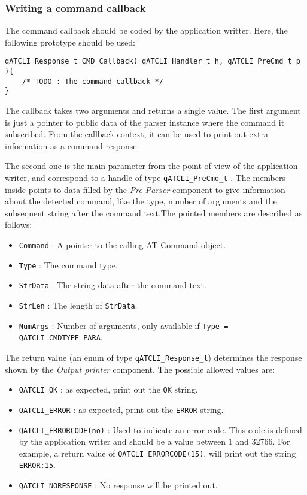 \subsubsection{Writing a command callback}
The command callback should be coded by the application writter. Here, the following prototype should be used:
\medskip

\begin{lstlisting}[style=CStyle]
qATCLI_Response_t CMD_Callback( qATCLI_Handler_t h, qATCLI_PreCmd_t p ){
    /* TODO : The command callback */
}
\end{lstlisting}

The callback takes two arguments and returns a single value. The first argument is just a pointer to public data of the parser instance where the command it subscribed. From the callback context, it can be used to print out extra information as a command response.
\medskip

The second one is the main parameter from the point of view of the application writer, and correspond to a handle of type \lstinline{qATCLI_PreCmd_t} . The members inside points to data filled by the \textit{Pre-Parser} component to give information about the detected command, like the type, number of arguments and the subsequent string after the command text.The pointed members are described as follows:

\begin{itemize}
    \item \lstinline{Command} : A pointer to the calling AT Command object.
    \item \lstinline{Type} : The command type.
    \item \lstinline{StrData} : The string data after the command text.
    \item \lstinline{StrLen} : The length of \lstinline{StrData}.
    \item \lstinline{NumArgs} : Number of arguments, only available if \lstinline{Type = QATCLI_CMDTYPE_PARA}.
\end{itemize}

The return value (an enum of type \lstinline{qATCLI_Response_t})  determines the response shown by the \textit{Output printer} component. The possible allowed values are:

\begin{itemize}
    \item \lstinline{QATCLI_OK} : as expected, print out the \lstinline{OK} string.
    \item \lstinline{QATCLI_ERROR} : as expected, print out the \lstinline{ERROR} string.
    \item \lstinline{QATCLI_ERRORCODE(no)} : Used to indicate an error code. This code is defined by the application writer and should be a value between 1 and 32766. For example, a return value of \lstinline{QATCLI_ERRORCODE(15)}, will print out the string \lstinline{ERROR:15}.
    \item \lstinline{QATCLI_NORESPONSE} : No response will be printed out.
\end{itemize}


